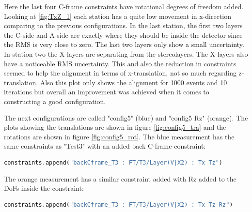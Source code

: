 Here the last four C-frame constraints have rotational degrees of freedom added.
Looking at \ref{fig:TxZ_1} each station has a quite low movement in x-direction comparing to the previous configurations. In the last station, the first two layers the C-side and A-side are exactly where they should be inside the detector since the RMS is very close to zero. The last two layers only show a small uncertainty. In station
two the X-layers are separating from the stereolayers. The X-layers also have a noticeable RMS uncertainty.
This and also the reduction in constraints seemed to help the alignment in terms of x-translation, not so much regarding z-translation. Also this plot only shows the alignment for 1000 events and 10 iterations but overall an improvement was achieved
when it comes to constructing a good configuration.

The next configurations are called "config5" (blue) and "config5 Rz" (orange). The plots showing the translations are shown in figure \ref{fig:config5_tra} and the rotations are shown in figure \ref{fig:config5_rot}.
The blue measurement has the same constraints as "Test3" with an added back C-frame constraint:
\begin{lstlisting}[language=Python]
  constraints.append("backCframe_T3 : FT/T3/Layer(V|X2) : Tx Tz")
\end{lstlisting}

The orange measurement has a similar constraint added with Rz added to the DoFs inside the constraint:
\begin{lstlisting}[language=Python]
  constraints.append("backCframe_T3 : FT/T3/Layer(V|X2) : Tx Tz Rz")
\end{lstlisting}

